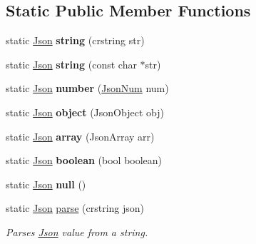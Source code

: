 \subsection*{Static Public Member Functions}
\begin{DoxyCompactItemize}
\item 
\mbox{\label{classnta_1_1utils_1_1Json_add20ea70d84582b2446dc53be92ac50c}} 
static \hyperlink{classnta_1_1utils_1_1Json}{Json} {\bfseries string} (crstring str)
\item 
\mbox{\label{classnta_1_1utils_1_1Json_a84415d3c83a91fed0689276c538e886e}} 
static \hyperlink{classnta_1_1utils_1_1Json}{Json} {\bfseries string} (const char $\ast$str)
\item 
\mbox{\label{classnta_1_1utils_1_1Json_a5e985dfb6c9148df9401b89265a0852c}} 
static \hyperlink{classnta_1_1utils_1_1Json}{Json} {\bfseries number} (\hyperlink{classnta_1_1utils_1_1JsonNum}{Json\+Num} num)
\item 
\mbox{\label{classnta_1_1utils_1_1Json_ac5e29dac15a59829e1f6e927fe8cde5d}} 
static \hyperlink{classnta_1_1utils_1_1Json}{Json} {\bfseries object} (Json\+Object obj)
\item 
\mbox{\label{classnta_1_1utils_1_1Json_a2a99930e97628a41cf647cbdb52d8a76}} 
static \hyperlink{classnta_1_1utils_1_1Json}{Json} {\bfseries array} (Json\+Array arr)
\item 
\mbox{\label{classnta_1_1utils_1_1Json_a023ca360caf8dbb385a805b0c21c98c3}} 
static \hyperlink{classnta_1_1utils_1_1Json}{Json} {\bfseries boolean} (bool boolean)
\item 
\mbox{\label{classnta_1_1utils_1_1Json_a89aa8497a420120774eec8335a6bf42e}} 
static \hyperlink{classnta_1_1utils_1_1Json}{Json} {\bfseries null} ()
\item 
\mbox{\label{classnta_1_1utils_1_1Json_ac4e9f86cd5c15c077f993d86a68eb044}} 
static \hyperlink{classnta_1_1utils_1_1Json}{Json} \hyperlink{classnta_1_1utils_1_1Json_ac4e9f86cd5c15c077f993d86a68eb044}{parse} (crstring json)
\begin{DoxyCompactList}\small\item\em Parses \hyperlink{classnta_1_1utils_1_1Json}{Json} value from a string. \end{DoxyCompactList}\end{DoxyCompactItemize}
